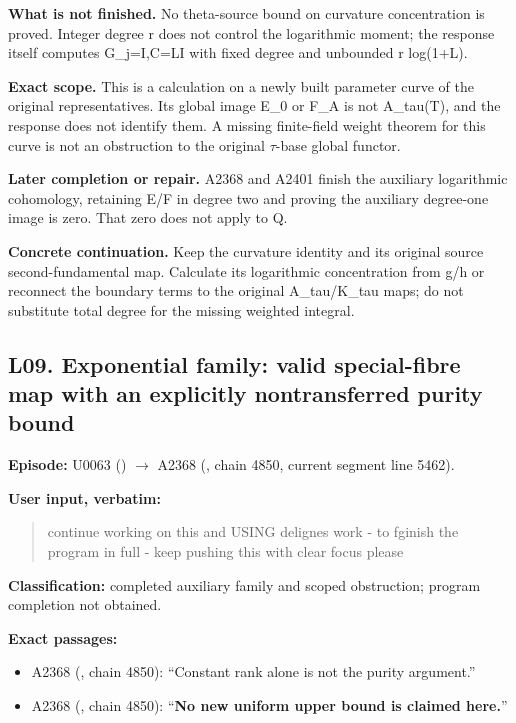 \documentclass[10pt,a4paper,oneside]{report}
\providecommand{\tightlist}{\setlength{\itemsep}{0pt}\setlength{\parskip}{0pt}}
\begin{document}
\textbf{What is not finished.} No theta-source bound on curvature
concentration is proved. Integer degree r does not control the
logarithmic moment; the response itself computes G\_j=I,C=LI with fixed
degree and unbounded r log(1+L).

\textbf{Exact scope.} This is a calculation on a newly built parameter
curve of the original representatives. Its global image E\_0 or F\_A is
not A\_tau(T), and the response does not identify them. A missing
finite-field weight theorem for this curve is not an obstruction to the
original \allowbreak{}\ensuremath{τ}\allowbreak{}-base global functor.

\textbf{Later completion or repair.} A2368 and A2401 finish the
auxiliary logarithmic cohomology, retaining E/F in degree two and
proving the auxiliary degree-one image is zero. That zero does not apply
to Q.

\textbf{Concrete continuation.} Keep the curvature identity and its
original source second-fundamental map. Calculate its logarithmic
concentration from g/h or reconnect the boundary terms to the original
A\_tau/K\_tau maps; do not substitute total degree for the missing
weighted integral.

\subsection{L09. Exponential family: valid special-fibre map with an
explicitly nontransferred purity
bound}\label{l09.-exponential-family-valid-special-fibre-map-with-an-explicitly-nontransferred-purity-bound}

\textbf{Episode:} U0063
(\protect{})
\allowbreak{}\ensuremath{→}\allowbreak{} A2368
(\protect{}, chain 4850,
current segment line 5462).

\textbf{User input, verbatim:}

\begin{quote}
continue working on this and USING delignes work - to fginish the
program in full - keep pushing this with clear focus please
\end{quote}

\textbf{Classification:} completed auxiliary family and scoped
obstruction; program completion not obtained.

\textbf{Exact passages:}

\begin{itemize}
\tightlist
\item
  A2368 (\protect{}, chain
  4850): ``Constant rank alone is not the purity argument.''
\item
  A2368 (\protect{}, chain
  4850): ``\textbf{No new uniform upper bound is claimed here.}''
\end{itemize}
\end{document}
